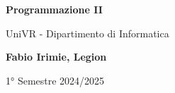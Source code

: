 \begin{titlepage}
	\begin{center}
		\vspace*{1cm}

		\Huge
    \textbf{Programmazione II}

		\vspace{0.5cm}
		\LARGE
		UniVR - Dipartimento di Informatica

		\vspace{1.5cm}

		\textbf{Fabio Irimie, Legion}

		\vfill


		\vspace{0.8cm}


		1° Semestre 2024/2025

	\end{center}
\end{titlepage}
